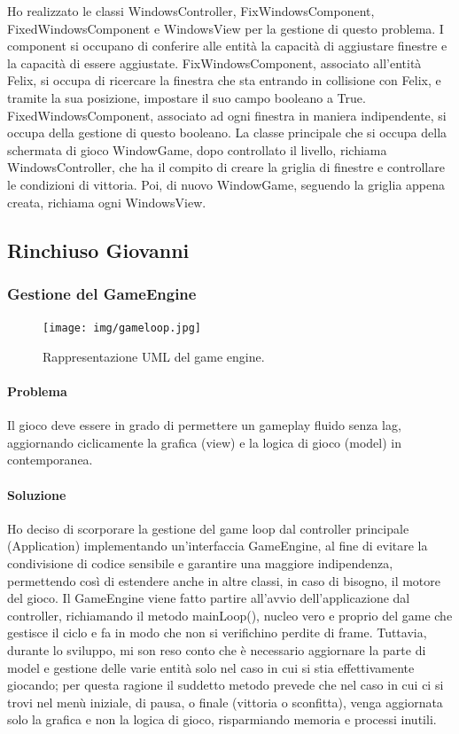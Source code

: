Ho realizzato le classi WindowsController, FixWindowsComponent, FixedWindowsComponent e WindowsView per la gestione di questo problema. 
I component  si occupano di conferire alle entità la capacità di aggiustare finestre e la capacità di essere aggiustate.
FixWindowsComponent, associato all'entità Felix, si occupa di ricercare la finestra che sta entrando in collisione con Felix, e tramite la sua posizione, impostare il suo campo booleano a True.
FixedWindowsComponent, associato ad ogni finestra in maniera indipendente, si occupa della gestione di questo booleano.
La classe principale che si occupa della schermata di gioco WindowGame, dopo controllato il livello, richiama WindowsController, che ha il compito di creare la griglia di finestre e controllare le condizioni di vittoria.
Poi, di nuovo WindowGame, seguendo la griglia appena creata, richiama ogni WindowsView.



\subsection{Rinchiuso Giovanni}

\subsubsection{Gestione del GameEngine}

\begin{figure}[H]
\centering{}
\texttt{[image: img/gameloop.jpg]}
\caption{Rappresentazione UML del game engine.}
\end{figure}

\paragraph{Problema} Il gioco deve essere in grado di permettere un gameplay fluido senza lag, aggiornando ciclicamente la grafica (view) e la logica di gioco (model) in contemporanea.

\paragraph{Soluzione} Ho deciso di scorporare la gestione del game loop dal controller principale (Application) implementando un’interfaccia GameEngine, al fine di evitare la condivisione di codice sensibile e garantire una maggiore indipendenza, permettendo così di estendere anche in altre classi, in caso di bisogno, il motore del gioco. Il GameEngine viene fatto partire all’avvio dell’applicazione dal controller, richiamando il metodo mainLoop(), nucleo vero e proprio del game che gestisce il ciclo e fa in modo che non si verifichino perdite di frame. Tuttavia, durante lo sviluppo, mi son reso conto che è necessario aggiornare la parte di model e gestione delle varie entità solo nel caso in cui si stia effettivamente giocando; per questa ragione il suddetto metodo prevede che nel caso in cui ci si trovi nel menù iniziale, di pausa, o finale (vittoria o sconfitta), venga aggiornata solo la grafica e non la logica di gioco, risparmiando memoria e processi inutili.

